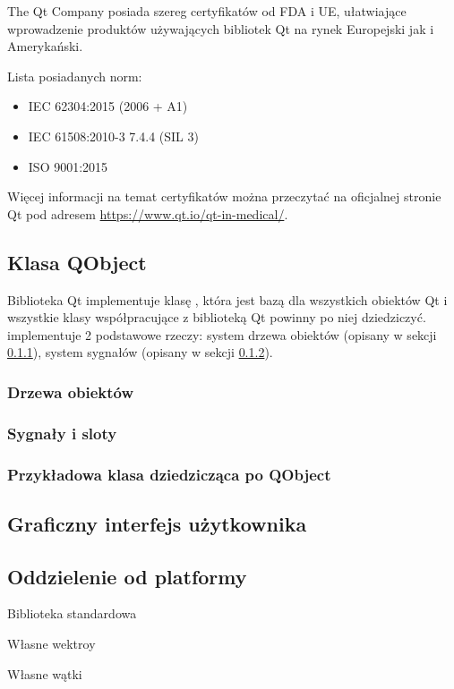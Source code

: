 \par
The Qt Company posiada szereg certyfikatów od FDA i UE, ułatwiające wprowadzenie produktów używających bibliotek Qt na rynek Europejski jak i Amerykański.
\par
Lista posiadanych norm:
\begin{itemize}
    \item IEC 62304:2015 (2006 + A1)
    \item IEC 61508:2010-3 7.4.4 (SIL 3)
    \item ISO 9001:2015 
\end{itemize}
Więcej informacji na temat certyfikatów można przeczytać na oficjalnej stronie Qt pod adresem \url{https://www.qt.io/qt-in-medical/}.

\subsection{Klasa QObject}

\qtclassExplanations

\par
Biblioteka Qt implementuje klasę , która jest bazą dla wszystkich obiektów Qt i wszystkie klasy współpracujące z biblioteką Qt powinny po niej dziedziczyć.
 implementuje 2 podstawowe rzeczy: system drzewa obiektów (opisany w sekcji \ref{sec:qt-pareting}), system sygnałów (opisany w sekcji \ref{sec:qt-signals}).

\subsubsection{Drzewa obiektów}
\label{sec:qt-pareting}


\subsubsection{Sygnały i sloty}
\label{sec:qt-signals}


\subsubsection{Przykładowa klasa dziedzicząca po QObject}


\subsection{Graficzny interfejs użytkownika}
\label{sec:qt-gui}


\subsection{Oddzielenie od platformy}

Biblioteka standardowa

Własne wektroy

Własne wątki
